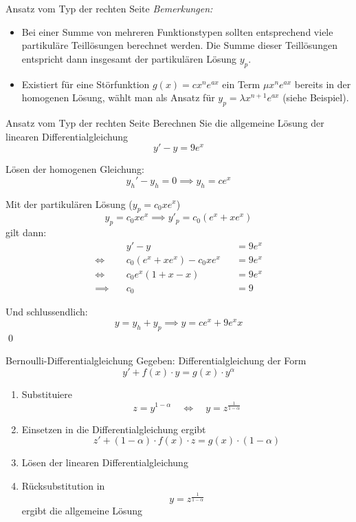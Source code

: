 \documentclass[german]{../spicker}
\begin{document}
\begin{algo}{Ansatz vom Typ der rechten Seite}
    \emph{Bemerkungen:}
    \begin{itemize}
        \item Bei einer Summe von mehreren Funktionstypen sollten entsprechend viele partikuläre Teillösungen berechnet werden. Die Summe dieser Teillösungen entspricht dann insgesamt der partikulären Lösung $y_p$.
        \item Existiert für eine Störfunktion $g(x) = cx^ne^{ax}$ ein Term $\mu x^ne^{ax}$ bereits in der homogenen Lösung, wählt man als Ansatz für $y_p = \lambda x^{n+1}e^{ax}$ (siehe Beispiel).
    \end{itemize}
\end{algo}

\begin{example}{Ansatz vom Typ der rechten Seite}
    Berechnen Sie die allgemeine Lösung der linearen Differentialgleichung
    $$
        y'- y = 9e^x
    $$
    \noindent\makebox[\linewidth]{\rule{\textwidth}{1pt}}

    Lösen der homogenen Gleichung:
    $$
        y_h'- y_h = 0 \implies y_h = ce^{x}
    $$

    Mit der partikulären Lösung ($y_p = c_0xe^{x}$)
    $$
        y_p = c_0xe^x \implies y'_p = c_0(e^x + xe^x)
    $$
    gilt dann:
    $$
        \begin{aligned}
                           & y'- y                     &  & = 9e^x \\
            \iff \quad     & c_0(e^x + xe^x) - c_0xe^x &  & = 9e^x \\
            \iff \quad     & c_0e^x(1 + x - x)         &  & = 9e^x \\
            \implies \quad & c_0                       &  & = 9
        \end{aligned}
    $$

    Und schlussendlich:
    $$
        y = y_h + y_p \implies y = ce^x + 9e^xx
    $$\qed
\end{example}

\begin{algo}{Bernoulli-Differentialgleichung}
    Gegeben: Differentialgleichung der Form
    $$
        \boxed{y' + f(x) \cdot y = g(x)\cdot y^\alpha}
    $$
    \begin{enumerate}
        \item Substituiere
              $$
                  z = y^{1-\alpha} \quad \iff \quad y = z^{\frac{1}{1-\alpha}}
              $$
        \item Einsetzen in die Differentialgleichung ergibt
              $$
                  z' + (1-\alpha) \cdot f(x)\cdot z = g(x) \cdot (1-\alpha)
              $$
        \item Lösen der linearen Differentialgleichung
        \item Rücksubstitution in
              $$
                  y = z^{\frac{1}{1-\alpha}}
              $$
              ergibt die allgemeine Lösung
    \end{enumerate}
\end{algo}
\end{document}
